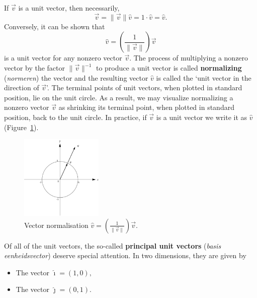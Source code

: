 If $\vec{v}$ is a unit vector, then necessarily,  
$$
\vec{v} = \| \vec{v} \| \hat{v} = 1 \cdot \hat{v} = \hat{v}.
$$
 Conversely, it can be shown that 
$$\hat{v} = \left( \frac{1}{\| \vec{v} \|} \right) \vec{v}$$
 is a unit vector for any nonzero vector $\vec{v}$.   The process of multiplying a nonzero vector by the factor $\| \vec{v} \|^{-1}$ to produce a unit vector is called  \textbf{normalizing} (\textit{normeren}) the vector and the resulting vector $\hat{v}$ is called the `unit vector in the direction of $\vec{v}$'.  The terminal points of unit vectors, when plotted in standard position, lie on the unit circle.  As a result, we may visualize normalizing a nonzero vector $\vec{v}$ as shrinking its terminal point, when plotted in standard position, back to the unit circle.  In practice, if $\vec{v}$ is a unit vector we write it as $\hat{v}$ (Figure~\ref{fig_vector_9}). 

\begin{figure}[H]
	\begin{center}
			\includegraphics[width=0.35\textwidth]{fig_vector_9}
	\caption{Vector normalisation $\hat{v} = \left( \frac{1}{\| \vec{v} \|} \right) \vec{v}$. }
	\label{fig_vector_9}
	\end{center}
\end{figure}


Of all of the unit vectors, the so-called  \textbf{principal unit vectors} (\textit{basis eenheidsvector}) deserve special attention. In two dimensions, they are given by

\begin{itemize}

\item The vector $\hat{\imath} = \left(1,0\right),$

\item The vector $\hat{\jmath} = \left(0,1\right).$

\end{itemize}


